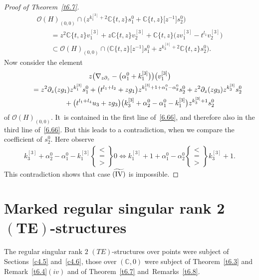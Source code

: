 \documentclass[10pt,a4paper]{amsart}
\numberwithin{equation}{section}
\numberwithin{figure}{section}
\newcommand{\C}{{\mathbb C}}
\newcommand{\OO}{{\mathcal O}}
\newcommand{\www}{\widetilde}
\newcommand{\paa}{\partial}
\newcommand{\nnn}{\nabla}
\begin{document}
\begin{proof}[Proof of Theorem~\ref{t6.7}]
\begin{gather}
 \OO(H)_{(0,0)}\cap\bigl( z^{k_1^{[3]}+2}\C\{t,z\}s_1^0 +
\C\{t,z\}\big[z^{-1}\big]s_2^0\bigr)\nonumber
\\ \qquad
{}= z^2\C\{t,z\}v_1^{[3]} + z\C\{t,z\}v_2^{[3]} +
\C\{t,z\}\big(zv_1^{[3]}-t^{l_1}v_2^{[3]}\big)\nonumber
\\ \qquad
{}\subset \OO(H)_{(0,0)}\cap \bigl(
\C\{t,z\}\big[z^{-1}\big]s_1^0 + z^{k_3^{[3]}+2}\C\{t,z\}s_2^0\bigr).\label{6.66}
\end{gather}
Now consider the element
\begin{gather*}
z\big(\nnn_{z\paa_z}-\big(\alpha_1^0+k_1^{[3]}\big)\big)\big(v_1^{[3]}\big)
\\ \qquad
{}= z^2\paa_z(zg_1)z^{k_1^{[3]}}s_1^0
+ \big(t^{l_1+l_2}+zg_1\big)z^{k_1^{[3]}+1+\alpha_1^0-\alpha_2^0}s_2^0 + z^2\paa_z(zg_3)z^{k_3^{[3]}}s_2^0
\\ \qquad \hphantom{=}
{}
+ \big(t^{l_1+l_4}u_3+zg_3\big)\big(k_3^{[3]}+\alpha_2^0
-\alpha_1^0-k_1^{[3]}\big)z^{k_3^{[3]}+1}s_2^0
\end{gather*}
of $\OO(H)_{(0,0)}$. It~is contained in the first line of~\eqref{6.66},
and therefore also in the third line of~\eqref{6.66}.
But this leads to a contradiction, when we compare the
coefficient of $s_2^0$. Here observe
\begin{gather*}
k_3^{[3]}+\alpha_2^0-\alpha_1^0-k_1^{[3]}
\left\{\!\!\begin{array}{l}<\\=\\>\end{array}\!\!\right\} 0
\iff
k_1^{[3]}+1+\alpha_1^0-\alpha_2^0
\left\{\!\!\begin{array}{l}<\\=\\>\end{array}\!\!\right\} k_3^{[3]}+1.
\end{gather*}
This contradiction shows that case $\www{\rm (IV)}$
is impossible.
\end{proof}

\section[Marked regular singular rank 2 $(TE)$-structures]{Marked regular singular rank 2 $\boldsymbol{(TE)}$-structures}\label{c7}

The regular singular rank $2$ $(TE)$-structures over points
were subject of Sections~\ref{c4.5} and~\ref{c4.6},
those over $(\C,0)$ were subject of Theorem~\ref{t6.3}
and Remark~\ref{t6.4}$(iv)$ and of Theorem~\ref{t6.7}
and~Remarks~\ref{t6.8}.
\end{document}
